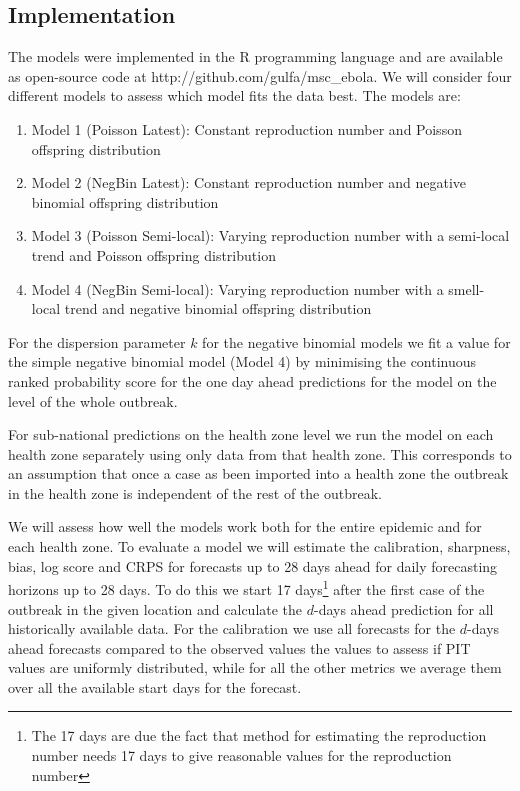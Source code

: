 \documentclass[12pt]{article}
\begin{document}
\subsection{Implementation}
The models were implemented in the R programming language \cite{rcoreteamLanguageEnvironmentStatistical2018} and are available as open-source code at http://github.com/gulfa/msc\_ebola. We will consider four different models to assess which model fits the data best. The models are:

\begin{enumerate}
\item{Model 1 (Poisson Latest): Constant reproduction number and Poisson offspring distribution}
\item{Model 2 (NegBin Latest): Constant reproduction number and negative binomial offspring distribution}
\item{Model 3 (Poisson Semi-local): Varying reproduction number with a semi-local trend and Poisson offspring distribution}
\item{Model 4 (NegBin Semi-local): Varying reproduction number with a smell-local trend and negative binomial offspring distribution}
\end{enumerate}

For the dispersion parameter $k$ for the negative binomial models we fit a value for the simple negative binomial model (Model 4) by minimising the continuous ranked probability score for the one day ahead predictions for the model on the level of the whole outbreak. 

For sub-national predictions on the health zone level we run the model on each health zone separately using only data from that health zone. This corresponds to an assumption that once a case as been imported into a health zone the outbreak in the health zone is independent of the rest of the outbreak.

We will assess how well the models work both for the entire epidemic and for each health zone. To evaluate a model we will estimate the calibration, sharpness, bias, log score and CRPS for forecasts up to 28 days ahead for daily forecasting horizons up to 28 days. To do this we start 17 days\footnote{The 17 days are due the fact that method for estimating the reproduction number needs 17 days to give reasonable values for the reproduction number} after the first case of the outbreak in the given location and calculate the $d$-days ahead prediction for all historically available data. For the calibration we use all forecasts for the $d$-days ahead forecasts compared to the observed values the values to assess if PIT values are uniformly distributed, while for all the other metrics we average them over all the available start days for the forecast.
\end{document}
